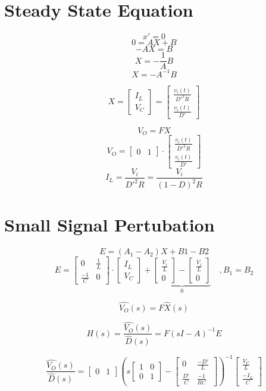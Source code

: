 \section{Steady State Equation}

\[ x' = 0 \]
\[ 0 = AX + B \]
\[ -AX = B \]
\[ X = -\frac{1}{A}B \]
\[ X = -A^{-1}B \]

\[
	X
	=
	\begin{bmatrix}
		I_L \\
		V_C
	\end{bmatrix}
	=
	\begin{bmatrix}
		\frac{v_i(t)}{D'^2 R} \\
		\frac{v_i(t)}{D'}
	\end{bmatrix}
\]

\[ V_O = F X \]
\[
	V_O
	= 
	\begin{bmatrix}
		0 & 1
	\end{bmatrix}
	\cdot
	\begin{bmatrix}
		\frac{v_i(t)}{D'^2 R} \\
		\frac{v_i(t)}{D'}
	\end{bmatrix}
\]
\[
	I_L
	= \frac{V_i}{D'^2 R}
	= \frac{V_i}{(1-D)^2 R}
\]

\section{Small Signal Pertubation}
\[	E = (A_1 - A_2)X + B1 - B2 \]
\[
	E =
	\begin{bmatrix}
		0 & \frac{1}{L} \\
		\frac{-1}{C} & 0
	\end{bmatrix}
	\cdot
	\begin{bmatrix}
		I_L \\
		V_C
	\end{bmatrix}
	+ \underbrace{
	\begin{bmatrix}
		\frac{V_i}{L} \\
		0
	\end{bmatrix}
	-
	\begin{bmatrix}
		\frac{V_i}{L} \\
		0
	\end{bmatrix}}_{0}
	\quad, B_1 = B_2
\]

\[
	\hat{V_O}(s) = F\hat{X}(s)
\]

\[
	H(s)
	= \frac{\hat{V_O}(s)}{\hat{D}(s)}
	= F ( s I - A )^{-1} E
\]

\[
	\frac{\hat{V_O}(s)}{\hat{D}(s)}
	=
	\begin{bmatrix}
		0 & 1
	\end{bmatrix}
	\left( s 
	\begin{bmatrix}
		1 & 0 \\
		0 & 1
	\end{bmatrix}
	-
	\begin{bmatrix}
		0 & \frac{-D'}{L} \\
		\frac{D'}{C} & \frac{-1}{R C}
	\end{bmatrix}
	\right)^{-1}
	\begin{bmatrix}
		\frac{V_C}{L} \\
		\frac{-I_L}{C}
	\end{bmatrix}
\]

